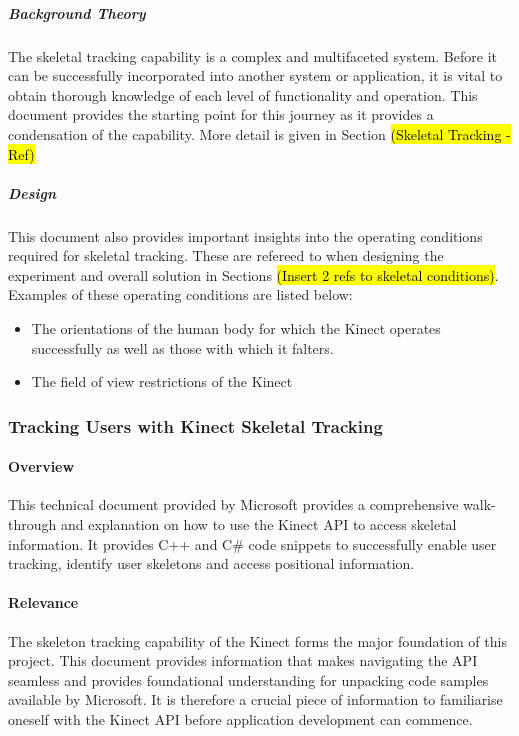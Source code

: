 \subparagraph{Background Theory}
The skeletal tracking capability is a complex and multifaceted system. Before it can be successfully incorporated into another system or application, it is vital to obtain thorough knowledge of each level of functionality and operation. This document provides the starting point for this journey as it provides a condensation of the capability. More detail is given in Section \hl{(Skeletal Tracking - Ref)}

\subparagraph{Design}
This document also provides important insights into the operating conditions required for skeletal tracking. These are refereed to when designing the experiment and overall solution in Sections \hl{(Insert 2 refs to skeletal conditions)}. Examples of these operating conditions are listed below:
\begin{itemize}
	\item The orientations of the human body for which the Kinect operates successfully as well as those with which it falters.  
	\item The field of view restrictions of the Kinect
\end{itemize}

\subsubsection{Tracking Users with Kinect Skeletal Tracking \cite{msdnTrackUserSkel2017}}

\paragraph{Overview}
This technical document provided by Microsoft provides a comprehensive walk-through and explanation on how to use the Kinect API to access skeletal information. It provides C++ and C\# code snippets to successfully enable user tracking, identify user skeletons and access positional information.

\paragraph{Relevance}
The skeleton tracking capability of the Kinect forms the major foundation of this project. This document provides information that makes navigating the API seamless and provides foundational understanding for unpacking code samples available by Microsoft. It is therefore a crucial piece of information to familiarise oneself with the Kinect API before application development can commence. 

